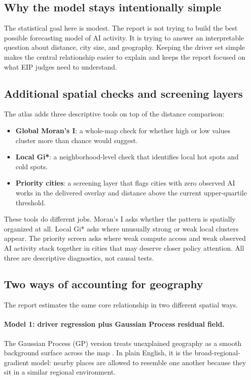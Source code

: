 \documentclass[11pt]{article}
\begin{document}
\subsection{Why the model stays intentionally simple}
The statistical goal here is modest. The report is not trying to build the best possible forecasting model of AI activity. It is trying to answer an interpretable question about distance, city size, and geography. Keeping the driver set simple makes the central relationship easier to explain and keeps the report focused on what EIP judges need to understand.

\subsection{Additional spatial checks and screening layers}
The atlas adds three descriptive tools on top of the distance comparison:
\begin{itemize}[leftmargin=*]
  \item \textbf{Global Moran's I}: a whole-map check for whether high or low values cluster more than chance would suggest.
  \item \textbf{Local Gi*}: a neighborhood-level check that identifies local hot spots and cold spots.
  \item \textbf{Priority cities}: a screening layer that flags cities with zero observed AI works in the delivered overlay and distance above the current upper-quartile threshold.
\end{itemize}

These tools do different jobs. Moran's I asks whether the pattern is spatially organized at all. Local Gi* asks where unusually strong or weak local clusters appear. The priority screen asks where weak compute access and weak observed AI activity stack together in cities that may deserve closer policy attention. All three are descriptive diagnostics, not causal tests.

\subsection{Two ways of accounting for geography}
The report estimates the same core relationship in two different spatial ways.

\paragraph{Model 1: driver regression plus Gaussian Process residual field.}
The Gaussian Process (GP) version treats unexplained geography as a smooth background surface across the map \citep{rasmussen2006}. In plain English, it is the broad-regional-gradient model: nearby places are allowed to resemble one another because they sit in a similar regional environment.
\end{document}
